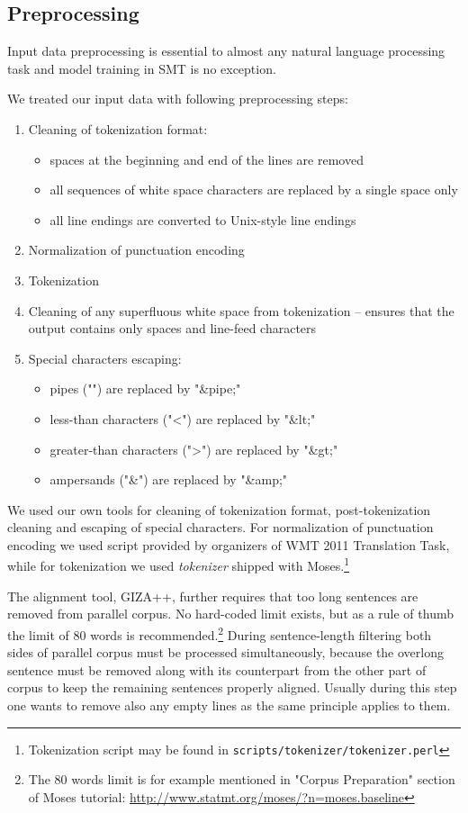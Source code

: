 \subsection{Preprocessing}

Input data preprocessing is essential to almost any natural language processing task
and model training in SMT is no exception.

We treated our input data with following preprocessing steps:
\begin{enumerate}
  \item Cleaning of tokenization format:
  \begin{itemize}
    \item spaces at the beginning and end of the lines are removed
    \item all sequences of white space characters are replaced by a single space only
    \item all line endings are converted to Unix-style line endings
  \end{itemize}
  \item Normalization of punctuation encoding
  \item Tokenization
  \item Cleaning of any superfluous white space from tokenization -- ensures that the output contains only spaces and line-feed characters
  \item Special characters escaping:
  \begin{itemize}
    \item pipes ("\textbar") are replaced by "\&pipe;"
    \item less-than characters ("<") are replaced by "\&lt;"
    \item greater-than characters (">") are replaced by "\&gt;"
    \item ampersands ("\&") are replaced by "\&amp;"
  \end{itemize}
\end{enumerate}

We used our own tools for cleaning of tokenization format,
post-tokenization cleaning and escaping of special characters.
For normalization of punctuation encoding we used script provided by organizers of
WMT 2011 Translation Task,
while for tokenization we used \emph{tokenizer} shipped with
Moses.\footnote{Tokenization script may be found in \texttt{scripts/tokenizer/tokenizer.perl}}

The alignment tool, GIZA++, further requires that too long sentences are removed from parallel corpus.
No hard-coded limit exists, but as a rule of thumb the limit of 80 words is
recommended.\footnote{The 80 words limit is for example mentioned in "Corpus Preparation" section of Moses tutorial:
\url{http://www.statmt.org/moses/?n=moses.baseline}}
During sentence-length filtering both sides of parallel corpus must be processed simultaneously,
because the overlong sentence must be removed along with its counterpart from the other part of corpus
to keep the remaining sentences properly aligned.
Usually during this step one wants to remove also any empty lines as the same principle applies to them.

